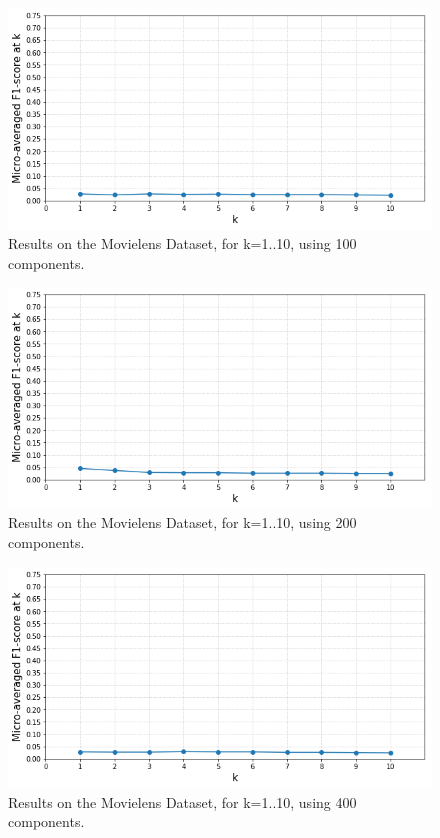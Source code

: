 \begin{figure}[H]
    \centering
    \includegraphics[width=\textwidth]{chapters/05_experiments/images/topic-distances-100d-movielens.png}
    \caption{Results on the Movielens Dataset, for k=1..10, using 100 components.}
    \label{fig:ovr_svm_movielens}
\end{figure}

\begin{figure}[H]
    \centering
    \includegraphics[width=\textwidth]{chapters/05_experiments/images/topic-distances-200d-movielens.png}
    \caption{Results on the Movielens Dataset, for k=1..10, using 200 components.}
    \label{fig:ovr_svm_movielens}
\end{figure}

\begin{figure}[H]
    \centering
    \includegraphics[width=\textwidth]{chapters/05_experiments/images/topic-distances-400d-movielens.png}
    \caption{Results on the Movielens Dataset, for k=1..10, using 400 components.}
    \label{fig:ovr_svm_movielens}
\end{figure}

